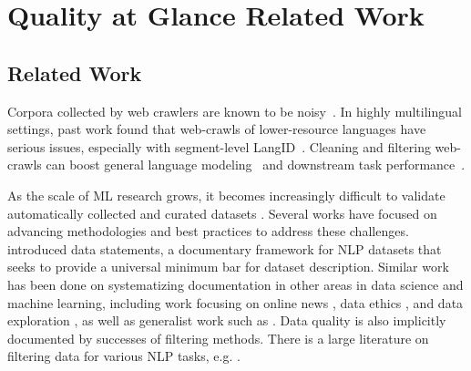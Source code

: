 \chapter{Quality at Glance Related Work}

\section{Related Work}\label{sec:related}

Corpora collected by web crawlers are known to be noisy~\citep{junczys-dowmunt-2019-microsoft,luccioni-viviano-2021-whats}. In highly multilingual settings, past work found that web-crawls of lower-resource languages have serious issues, especially with segment-level LangID~\citep{caswell-etal-2020-language}.
Cleaning and filtering web-crawls can boost general language modeling~\citep{gao-etal-2020-the,brown-etal-2020-language,raffel-etal-2020-exploring} and downstream task performance~\citep{moore-lewis-2010-intelligent,rarrick-etal-2011-mt,xu-koehn-2017-zipporah,khayrallah-koehn-2018-impact,brown-etal-2020-language}.

As the scale of ML research grows, it becomes increasingly difficult to validate automatically collected and curated datasets \citep{biderman-etal-2020-pitfalls,birhane-etal-2021-large,bender-etal-2021-on}.
Several works have focused on advancing methodologies and best practices to address these challenges. \citet{bender-friedman-2018-data} introduced data statements, a documentary framework for NLP datasets that seeks to provide a universal minimum bar for dataset description. Similar work has been done on systematizing documentation in other areas in data science and machine learning, including work focusing on
online news \citep{kevin-etal-2018-information}, data ethics \citep{sun-etal-2019-mithralabel}, and data exploration \citep{holland-etal-2018-the}, as well as generalist work such as \citep{gebru-etal-2018-datasheets}. 
Data quality is also implicitly documented by successes of filtering methods. There is a large literature on filtering data for various NLP tasks, e.g. \citet{axelrod-etal-2011-domain,moore-lewis-2010-intelligent,rarrick-etal-2011-mt,wang-etal-2018-denoising,kamholz-etal-2014-panlex,junczys-dowmunt-2018-dual,caswell-etal-2020-language}.

